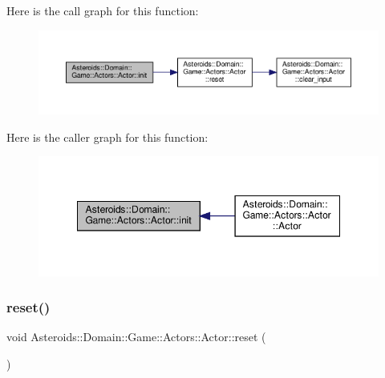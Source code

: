 Here is the call graph for this function\+:\nopagebreak
\begin{figure}[H]
\begin{center}
\leavevmode
\includegraphics[width=350pt]{classAsteroids_1_1Domain_1_1Game_1_1Actors_1_1Actor_a5f59fc92345120fdc67675ec0884b137_cgraph}
\end{center}
\end{figure}
Here is the caller graph for this function\+:\nopagebreak
\begin{figure}[H]
\begin{center}
\leavevmode
\includegraphics[width=348pt]{classAsteroids_1_1Domain_1_1Game_1_1Actors_1_1Actor_a5f59fc92345120fdc67675ec0884b137_icgraph}
\end{center}
\end{figure}
\mbox{\label{classAsteroids_1_1Domain_1_1Game_1_1Actors_1_1Actor_a538200753592ca63f7c3348fcece583f}} 
\subsubsection{\texorpdfstring{reset()}{reset()}}
{\footnotesize\ttfamily void Asteroids\+::\+Domain\+::\+Game\+::\+Actors\+::\+Actor\+::reset (\begin{DoxyParamCaption}{ }\end{DoxyParamCaption})}



